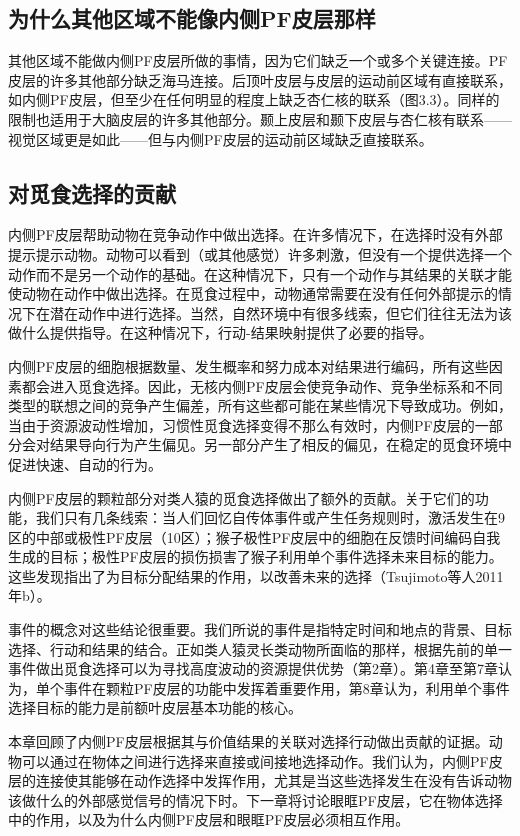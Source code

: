 \subsection{为什么其他区域不能像内侧PF皮层那样}
其他区域不能做内侧PF皮层所做的事情，因为它们缺乏一个或多个关键连接。PF皮层的许多其他部分缺乏海马连接。后顶叶皮层与皮层的运动前区域有直接联系，如内侧PF皮层，但至少在任何明显的程度上缺乏杏仁核的联系（图3.3）。同样的限制也适用于大脑皮层的许多其他部分。颞上皮层和颞下皮层与杏仁核有联系——视觉区域更是如此——但与内侧PF皮层的运动前区域缺乏直接联系。\par
\subsection{对觅食选择的贡献}
内侧PF皮层帮助动物在竞争动作中做出选择。在许多情况下，在选择时没有外部提示提示动物。动物可以看到（或其他感觉）许多刺激，但没有一个提供选择一个动作而不是另一个动作的基础。在这种情况下，只有一个动作与其结果的关联才能使动物在动作中做出选择。在觅食过程中，动物通常需要在没有任何外部提示的情况下在潜在动作中进行选择。当然，自然环境中有很多线索，但它们往往无法为该做什么提供指导。在这种情况下，行动-结果映射提供了必要的指导。\par
内侧PF皮层的细胞根据数量、发生概率和努力成本对结果进行编码，所有这些因素都会进入觅食选择。因此，无核内侧PF皮层会使竞争动作、竞争坐标系和不同类型的联想之间的竞争产生偏差，所有这些都可能在某些情况下导致成功。例如，当由于资源波动性增加，习惯性觅食选择变得不那么有效时，内侧PF皮层的一部分会对结果导向行为产生偏见。另一部分产生了相反的偏见，在稳定的觅食环境中促进快速、自动的行为。\par
内侧PF皮层的颗粒部分对类人猿的觅食选择做出了额外的贡献。关于它们的功能，我们只有几条线索：当人们回忆自传体事件或产生任务规则时，激活发生在9区的中部或极性PF皮层（10区）；猴子极性PF皮层中的细胞在反馈时间编码自我生成的目标；极性PF皮层的损伤损害了猴子利用单个事件选择未来目标的能力。这些发现指出了为目标分配结果的作用，以改善未来的选择（Tsujimoto等人2011年b）。\par
事件的概念对这些结论很重要。我们所说的事件是指特定时间和地点的背景、目标选择、行动和结果的结合。正如类人猿灵长类动物所面临的那样，根据先前的单一事件做出觅食选择可以为寻找高度波动的资源提供优势（第2章）。第4章至第7章认为，单个事件在颗粒PF皮层的功能中发挥着重要作用，第8章认为，利用单个事件选择目标的能力是前额叶皮层基本功能的核心。\par
本章回顾了内侧PF皮层根据其与价值结果的关联对选择行动做出贡献的证据。动物可以通过在物体之间进行选择来直接或间接地选择动作。我们认为，内侧PF皮层的连接使其能够在动作选择中发挥作用，尤其是当这些选择发生在没有告诉动物该做什么的外部感觉信号的情况下时。下一章将讨论眼眶PF皮层，它在物体选择中的作用，以及为什么内侧PF皮层和眼眶PF皮层必须相互作用。\par